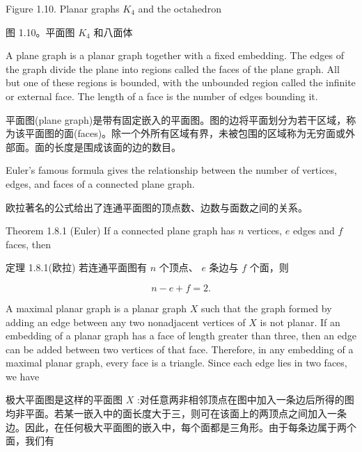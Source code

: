 \documentclass[10pt]{article}
\begin{document}
Figure 1.10. Planar graphs \({K}_{4}\) and the octahedron

\begin{tcolorbox}\relax
图 1.10。平面图 \({K}_{4}\) 和八面体
\end{tcolorbox}

A plane graph is a planar graph together with a fixed embedding. The edges of the graph divide the plane into regions called the faces of the plane graph. All but one of these regions is bounded, with the unbounded region called the infinite or external face. The length of a face is the number of edges bounding it.

\begin{tcolorbox}\relax
平面图(plane graph)是带有固定嵌入的平面图。图的边将平面划分为若干区域，称为该平面图的面(faces)。除一个外所有区域有界，未被包围的区域称为无穷面或外部面。面的长度是围成该面的边的数目。
\end{tcolorbox}

Euler's famous formula gives the relationship between the number of vertices, edges, and faces of a connected plane graph.

\begin{tcolorbox}\relax
欧拉著名的公式给出了连通平面图的顶点数、边数与面数之间的关系。
\end{tcolorbox}

Theorem 1.8.1 (Euler) If a connected plane graph has \(n\) vertices, \(e\) edges and \(f\) faces, then

\begin{tcolorbox}\relax
定理 1.8.1(欧拉) 若连通平面图有 \(n\) 个顶点、 \(e\) 条边与 \(f\) 个面，则
\end{tcolorbox}

\[
n - e + f = 2.
\]

A maximal planar graph is a planar graph \(X\) such that the graph formed by adding an edge between any two nonadjacent vertices of \(X\) is not planar. If an embedding of a planar graph has a face of length greater than three, then an edge can be added between two vertices of that face. Therefore, in any embedding of a maximal planar graph, every face is a triangle. Since each edge lies in two faces, we have

\begin{tcolorbox}\relax
极大平面图是这样的平面图 \(X\) :对任意两非相邻顶点在图中加入一条边后所得的图均非平面。若某一嵌入中的面长度大于三，则可在该面上的两顶点之间加入一条边。因此，在任何极大平面图的嵌入中，每个面都是三角形。由于每条边属于两个面，我们有
\end{tcolorbox}
\end{document}
